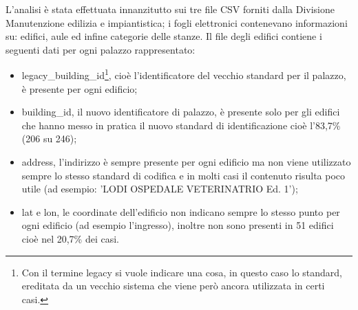 \documentclass[12pt]{report}
\begin{document}
\vspace{5mm} %

L'analisi è stata effettuata innanzitutto sui tre file CSV forniti dalla Divisione Manutenzione edilizia e impiantistica; i fogli elettronici contenevano informazioni su: edifici, aule ed infine categorie delle stanze.
Il file degli edifici contiene i seguenti dati per ogni palazzo rappresentato:
\begin{itemize}
\item legacy\_building\_id\footnote{Con il termine legacy si vuole indicare una cosa, in questo caso lo standard, ereditata da un vecchio sistema che viene però ancora utilizzata in certi casi.}, cioè l'identificatore del vecchio standard per il palazzo, è presente per ogni edificio;
\item building\_id, il nuovo identificatore di palazzo, è presente solo per gli edifici che hanno messo in pratica il nuovo standard di identificazione cioè l'83,7\% (206 su 246);
\item address, l'indirizzo è sempre presente per ogni edificio ma non viene utilizzato sempre lo stesso standard di codifica e in molti casi il contenuto risulta poco utile (ad esempio: 'LODI OSPEDALE VETERINATRIO Ed. 1');
\item lat e lon, le coordinate dell'edificio non indicano sempre lo stesso punto per ogni edificio (ad esempio l'ingresso), inoltre non sono presenti in 51 edifici cioè nel 20,7\% dei casi.
\end{itemize}

\vspace{5mm} %
\end{document}
